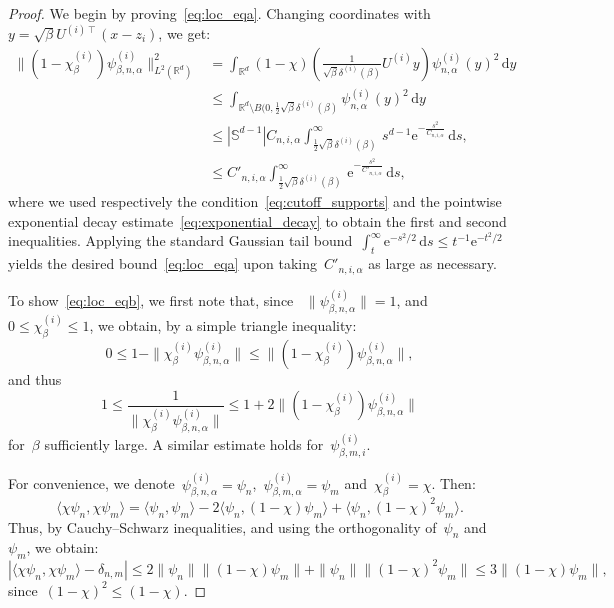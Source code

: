 \documentclass[10pt]{article}
\renewcommand{\d}{\mathrm{d}}
\newcommand{\e}{\mathrm{e}}
\newcommand{\R}{\mathbb{R}}
\newcommand{\1}{\mathbbm 1}
\newcommand{\deltai}{\delta^{(i)}}
\begin{document}
    \begin{proof}
        We begin by proving~\eqref{eq:loc_eqa}.
        Changing coordinates with~$y = \sqrt\beta U^{(i)\intercal}(x-z_i)$, we get:
        \begin{equation}
            \begin{aligned}
                \|(1-\chi_\beta^{(i)})\psi_{\beta,n,\alpha}^{(i)}\|^2_{L^2(\R^d)} &= \int_{\R^d}\left(1-\chi\right)\left(\frac1{\sqrt\beta\deltai(\beta)}U^{(i)}y\right)\psi^{(i)}_{n,\alpha}(y)^2\,\d y\\
                &\leq \int_{\R^d\setminus B(0,\frac12 \sqrt\beta\deltai(\beta)}\psi^{(i)}_{n,\alpha}(y)^2\,\d y\\
                &\leq |\mathbb S^{d-1}|C_{n,i,\alpha}\int_{\frac12 \sqrt\beta\deltai(\beta)}^\infty\,s^{d-1}\e^{-\frac{s^2}{C_{n,i,\alpha}}}\,\d s,\\
                &\leq C'_{n,i,\alpha}\int_{\frac12 \sqrt\beta\deltai(\beta)}^\infty\,\e^{-\frac{s^2}{C'_{n,i,\alpha}}}\,\d s,
            \end{aligned}
        \end{equation}
        where we used respectively the condition~\eqref{eq:cutoff_supports} and the pointwise exponential decay estimate~\eqref{eq:exponential_decay} to obtain the first and second inequalities. Applying the standard Gaussian tail bound~$\int_t^\infty \e^{-s^2/2}\,\d s \leq t^{-1}\e^{-t^2/2}$ yields the desired bound~\eqref{eq:loc_eqa} upon taking~$C'_{n,i,\alpha}$ as large as necessary.

        To show~\eqref{eq:loc_eqb}, we first note that, since
       ~$\|\psi^{(i)}_{\beta,n,\alpha}\| =1$, and~$0\leq \chi_\beta^{(i)}\leq 1$, we obtain, by a simple triangle inequality:
        \[0\leq 1-\|\chi_\beta^{(i)}\psi^{(i)}_{\beta,n,\alpha}\|\leq \|(1-\chi_\beta^{(i)})\psi^{(i)}_{\beta,n,\alpha}\|,\]
        and thus
        \begin{equation}
            \label{eq:lemme2_normalization}
            1\leq \frac1{\|\chi_\beta^{(i)}\psi^{(i)}_{\beta,n,\alpha}\|} \leq 1 + 2\|(1-\chi_\beta^{(i)})\psi^{(i)}_{\beta,n,\alpha}\|
        \end{equation}
        for~$\beta$ sufficiently large. A similar estimate holds for~$\psi^{(i)}_{\beta,m,i}$.

        For convenience, we denote~$\psi^{(i)}_{\beta,n,\alpha} = \psi_n$,~$\psi^{(i)}_{\beta,m,\alpha}=\psi_m$ and~$\chi_\beta^{(i)}=\chi$. Then:
        \[\langle \chi \psi_n,\chi \psi_m\rangle = \langle \psi_n,\psi_m\rangle - 2\langle \psi_n,(1-\chi)\psi_m\rangle + \langle\psi_n,(1-\chi)^2\psi_m\rangle.\]
        Thus, by Cauchy--Schwarz inequalities, and using the orthogonality of~$\psi_n$ and~$\psi_m$, we obtain:
       \[ \left|\langle \chi\psi_n,\chi\psi_m\rangle - \delta_{n,m}\right| \leq 2 \|\psi_n\|\|(1-\chi)\psi_m\| + \|\psi_n\|\|(1-\chi)^2\psi_m\| \leq 3\|(1-\chi)\psi_m\|,\]
       since~$(1-\chi)^2\leq (1-\chi)$.
        

\end{proof}
\end{document}

